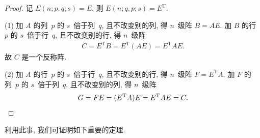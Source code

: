 \documentclass[../libro.tex]{subfiles}
\begin{document}
\begin{proof}
    记 \(E(n; p, q; s) = E\).
    则 \(E(n; q, p; s) = E^{\mathrm{T}}\).

    (1)
    加 \(A\) 的列~\(p\) 的 \(s\)~倍于列~\(q\),
    且不改变别的列, 得 \(n\)~级阵
    \(B = A E\).
    加 \(B\) 的行~\(p\) 的 \(s\)~倍于行~\(q\),
    且不改变别的行, 得 \(n\)~级阵
    \begin{align*}
        C
        = E^{\mathrm{T}} B
        = E^{\mathrm{T}} (A E)
        = E^{\mathrm{T}} A E.
    \end{align*}
    故 \(C\) 是一个反称阵.


    (2)
    加 \(A\) 的行~\(p\) 的 \(s\)~倍于行~\(q\),
    且不改变别的行, 得 \(n\)~级阵
    \(F = E^{\mathrm{T}} A\).
    加 \(F\) 的列~\(p\) 的 \(s\)~倍于列~\(q\),
    且不改变别的列, 得 \(n\)~级阵
    \begin{equation*}
        G
        = F E
        = (E^{\mathrm{T}} A) E
        = E^{\mathrm{T}} A E
        = C.
        \qedhere
    \end{equation*}
\end{proof}

利用此事, 我们可证明如下重要的定理.
\end{document}
